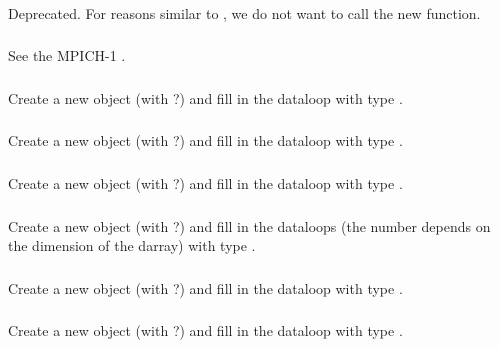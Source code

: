 \documentclass{article}
\begin{document}
\subsubsection{}
Deprecated.  For reasons similar to , we do not want
to call the new function.

\subsubsection{}
See the MPICH-1 .

\subsubsection{}
Create a new object (with ?) and fill in the dataloop
with type .  

\subsubsection{}
Create a new object (with ?) and fill in the dataloop
with type .

\subsubsection{}
Create a new object (with ?) and fill in the dataloop
with type .

\subsubsection{}
Create a new object (with ?) and fill in the
dataloops (the number depends on the dimension of the darray) 
with type .

\subsubsection{}
Create a new object (with ?) and fill in the dataloop
with type .

\subsubsection{}
Create a new object (with ?) and fill in the dataloop
with type .
\end{document}
